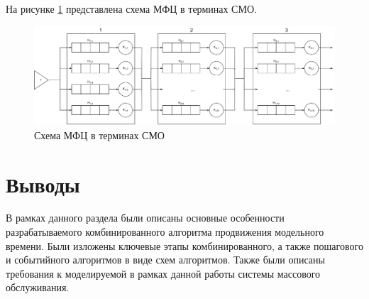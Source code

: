 На рисунке \ref{img:system_modelling} представлена схема МФЦ в терминах СМО.

\begin{figure}[h!btp]
	\centering
	\includegraphics[width=1\columnwidth]{inc/img/system_modelling.pdf}
	\caption{Схема МФЦ в терминах СМО}
	\label{img:system_modelling}	
\end{figure}

	
\section{Выводы}
В рамках данного раздела были описаны основные особенности разрабатываемого комбинированного алгоритма продвижения модельного времени. Были изложены ключевые этапы комбинированного, а также пошагового и событийного алгоритмов в виде схем алгоритмов. Также были описаны требования к моделируемой в рамках данной работы системы массового обслуживания.